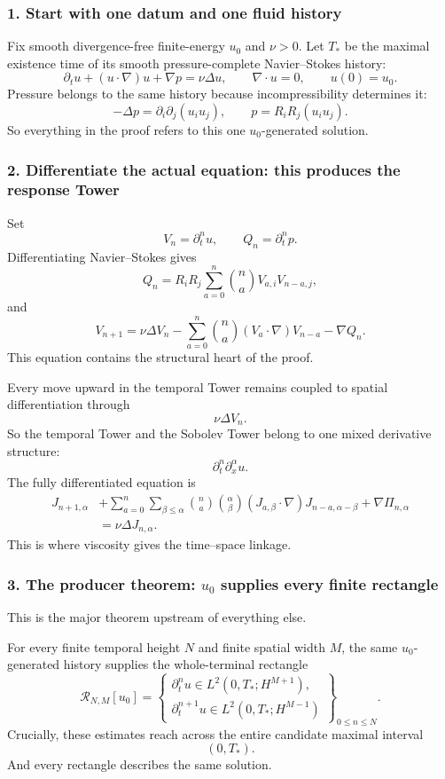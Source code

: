 \documentclass[11pt]{article}
\theoremstyle{definition}
\theoremstyle{remark}
\begin{document}
\subsubsection*{1. Start with one datum and one fluid history}

Fix smooth divergence-free finite-energy \(u_0\) and \(\nu>0\).  Let \(T_*\)
be the maximal existence time of its smooth pressure-complete Navier--Stokes
history:
\[
\partial_tu+(u\cdot\nabla)u+\nabla p
=
\nu\Delta u,
\qquad
\nabla\cdot u=0,
\qquad
u(0)=u_0.
\]
Pressure belongs to the same history because incompressibility determines it:
\[
-\Delta p=\partial_i\partial_j(u_i u_j),
\qquad
p=R_iR_j(u_i u_j).
\]
So everything in the proof refers to this one \(u_0\)-generated solution.

\subsubsection*{2. Differentiate the actual equation: this produces the response Tower}

Set
\[
V_n=\partial_t^n u,
\qquad
Q_n=\partial_t^n p.
\]
Differentiating Navier--Stokes gives
\[
Q_n
=
R_iR_j
\sum_{a=0}^n
\binom na
V_{a,i}V_{n-a,j},
\]
and
\[
\boxed{
V_{n+1}
=
\nu\Delta V_n
-
\sum_{a=0}^n
\binom na
(V_a\cdot\nabla)V_{n-a}
-
\nabla Q_n .
}
\]
This equation contains the structural heart of the proof.

Every move upward in the temporal Tower remains coupled to spatial
differentiation through
\[
\nu\Delta V_n.
\]
So the temporal Tower and the Sobolev Tower belong to one mixed derivative
structure:
\[
\partial_t^n\partial_x^\alpha u.
\]
The fully differentiated equation is
\[
\begin{aligned}
J_{n+1,\alpha}
&+
\sum_{a=0}^{n}\sum_{\beta\le\alpha}
\binom na\binom\alpha\beta
(J_{a,\beta}\cdot\nabla)
J_{n-a,\alpha-\beta}
+\nabla\Pi_{n,\alpha}
\\
&=
\nu\Delta J_{n,\alpha}.
\end{aligned}
\]
This is where viscosity gives the time--space linkage.

\subsubsection*{3. The producer theorem: \(u_0\) supplies every finite rectangle}

This is the major theorem upstream of everything else.

For every finite temporal height \(N\) and finite spatial width \(M\), the
same \(u_0\)-generated history supplies the whole-terminal rectangle
\[
\boxed{
\mathcal R_{N,M}[u_0]
=
\left\{
\begin{array}{l}
\partial_t^n u\in L^2(0,T_*;H^{M+1}),\\[2mm]
\partial_t^{n+1}u\in L^2(0,T_*;H^{M-1})
\end{array}
\right\}_{0\le n\le N}.
}
\]
Crucially, these estimates reach across the entire candidate maximal interval
\[
(0,T_*).
\]
And every rectangle describes the same solution.
\end{document}
